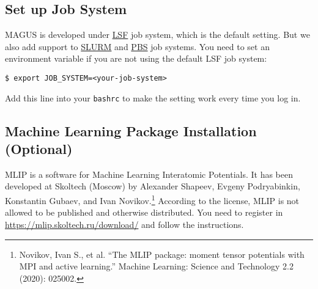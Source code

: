 \documentclass[12pt,oneside]{book}
\newcommand{\file}[1]{\texttt{#1}}
\newcommand{\chref}[3][blue]{\textcolor{#1}{\href{#2}{#3}}} %
\begin{document}
\subsection{Set up Job System}
MAGUS is developed under \chref{https://www.ibm.com/docs/en/spectrum-lsf}{LSF} job system, which is the default setting. But we also add support to \chref{https://slurm.schedmd.com}{SLURM} and \chref{https://www.openpbs.org/}{PBS} job systems. You need to set an environment variable if you are not using the default LSF job system:
\begin{tcolorbox}
    \begin{verbatim}
$ export JOB_SYSTEM=<your-job-system>
    \end{verbatim}
\end{tcolorbox}
Add this line into your \file{bashrc} to make the setting work every time you log in.

\subsection{Machine Learning Package Installation (Optional)}
MLIP is a software for Machine Learning Interatomic Potentials. It has been developed at Skoltech (Moscow) by Alexander Shapeev, Evgeny Podryabinkin, Konstantin Gubaev, and Ivan Novikov.\footnote{Novikov, Ivan S., et al. ``The MLIP package: moment tensor potentials with MPI and active learning.'' Machine Learning: Science and Technology 2.2 (2020): 025002.} According to the license, MLIP is not allowed to be published and otherwise distributed. You need to register in \url{https://mlip.skoltech.ru/download/} and follow the instructions.
\end{document}
